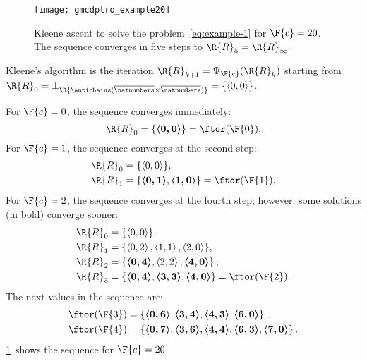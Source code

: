 \begin{figure}
    \begin{centering}
        \texttt{[image: gmcdptro\_example20]}
    \end{centering}
    \caption{\label{fig:example24}Kleene ascent to solve the problem~\cref{eq:example-1}
    for $\F{c}=20$. The sequence converges in five steps to $\R{R}_{5}=\R{R}_{\infty}.$ }
\end{figure}

\noindent Kleene's algorithm is the iteration $\R{R}_{k+1}=\Psi_{\F{c}}(\R{R}_{k})$
starting from $\R{R}_{0}=\bot_{\R{\antichains(\overline{\natnumbers}\times\overline{\natnumbers})}}=\{\left\langle 0,0\right\rangle \}$.

\noindent For $\F{c}=0$, the sequence converges immediately:
\[
    \R{R}_{0}=\{\boldsymbol{\left\langle 0,0\right\rangle }\}=\ftor(\F{0}).
\]
For $\F{c}=1$, the sequence converges at the second step:
\begin{align*}
    \R{R}_{0} & =\{\left\langle 0,0\right\rangle \},\\
    \R{R}_{1} & =\{\boldsymbol{\left\langle 0,1\right\rangle },\boldsymbol{\left\langle 1,0\right\rangle }\}=\ftor(\F{1}).
\end{align*}
For $\F{c}=2$, the sequence converges at the fourth step; however,
some solutions (in bold) converge sooner:
\begin{align*}
    \R{R}_{0} & =\{\left\langle 0,0\right\rangle \},\\
    \R{R}_{1} & =\{\left\langle 0,2\right\rangle ,\left\langle 1,1\right\rangle ,\left\langle 2,0\right\rangle \},\\
    \R{R}_{2} & =\left\{ \boldsymbol{\left\langle 0,4\right\rangle },\left\langle 2,2\right\rangle ,\boldsymbol{\left\langle 4,0\right\rangle }\right\} ,\\
    \R{R}_{3} & =\{\boldsymbol{\left\langle 0,4\right\rangle },\boldsymbol{\left\langle 3,3\right\rangle },\boldsymbol{\left\langle 4,0\right\rangle }\}=\ftor(\F{2}).
\end{align*}
The next values in the sequence are:
\begin{align*}
    \ftor(\F{3}) & =\left\{ \boldsymbol{\left\langle 0,6\right\rangle },\boldsymbol{\left\langle 3,4\right\rangle },\boldsymbol{\left\langle 4,3\right\rangle },\boldsymbol{\left\langle 6,0\right\rangle }\right\} ,\\
    \ftor(\F{4}) & =\left\{ \boldsymbol{\left\langle 0,7\right\rangle },\boldsymbol{\left\langle 3,6\right\rangle },\boldsymbol{\left\langle 4,4\right\rangle },\boldsymbol{\left\langle 6,3\right\rangle },\boldsymbol{\left\langle 7,0\right\rangle }\right\} .
\end{align*}
\cref{fig:example24}~shows the sequence for $\F{c}=20$.

